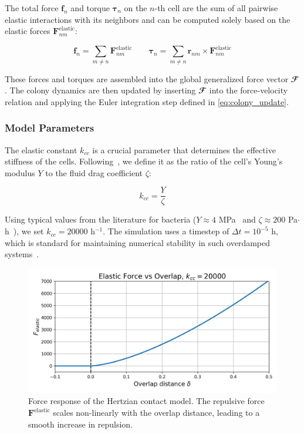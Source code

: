 \documentclass[conference]{IEEEtran}
\begin{document}
The total force $\mathbf{f}_n$ and torque $\boldsymbol{\tau}_n$ on the $n$-th cell are the sum of all pairwise elastic interactions with its neighbors and can be computed solely based on the elastic forces $\mathbf{F}^{\text{elastic}}_{nm}$:

\begin{equation}
    \mathbf{f}_n         = \sum_{m \neq n} \mathbf{F}^{\text{elastic}}_{nm} \qquad
    \boldsymbol{\tau}_n  = \sum_{m \neq n} \mathbf{r}_{nm} \times \mathbf{F}^{\text{elastic}}_{nm}
\end{equation}

These forces and torques are assembled into the global generalized force vector $\mathbfcal{F}$. The colony dynamics are then updated by inserting $\mathbfcal{F}$ into the force-velocity relation and applying the Euler integration step defined in \autoref{eq:colony_update}.

\subsubsection{Model Parameters}

The elastic constant $k_{cc}$ is a crucial parameter that determines the effective stiffness of the cells. Following~\cite{You2018}, we define it as the ratio of the cell's Young's modulus $Y$ to the fluid drag coefficient $\zeta$:

\begin{equation}
    k_{cc} = \frac{Y}{\zeta}
\end{equation}

Using typical values from the literature for bacteria ($Y \approx 4$ MPa~\cite{You2018, Blanchard2015} and $\zeta \approx 200$ Pa$\cdot$h~\cite{You2018}), we set $k_{cc} = 20000$ h$^{-1}$. The simulation uses a timestep of $\Delta t = 10^{-5}$ h, which is standard for maintaining numerical stability in such overdamped systems~\cite{Khan_2024, You2018, Blanchard2015}.

\begin{figure}[H]
    \centering
    \includegraphics[width=\linewidth]{figures/hertzian_contact_model.png}
    \caption{Force response of the Hertzian contact model. The repulsive force $\mathbf{F}^{\text{elastic}}$ scales non-linearly with the overlap distance, leading to a smooth increase in repulsion.}
    \label{fig:hertzian_contact_model}
\end{figure}
\end{document}
